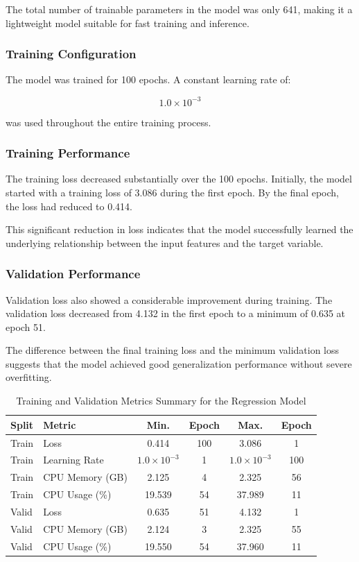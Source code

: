 \documentclass{ieeeaccess}
\begin{document}
The total number of trainable parameters in the model was only 641, making it a lightweight model suitable for fast training and inference.

\subsubsection{Training Configuration}

The model was trained for 100 epochs. A constant learning rate of:

\[
1.0 \times 10^{-3}
\]

was used throughout the entire training process.

\subsubsection{Training Performance}

The training loss decreased substantially over the 100 epochs. Initially, the model started with a training loss of 3.086 during the first epoch. By the final epoch, the loss had reduced to 0.414.

This significant reduction in loss indicates that the model successfully learned the underlying relationship between the input features and the target variable.

\subsubsection{Validation Performance}

Validation loss also showed a considerable improvement during training. The validation loss decreased from 4.132 in the first epoch to a minimum of 0.635 at epoch 51.

The difference between the final training loss and the minimum validation loss suggests that the model achieved good generalization performance without severe overfitting.

\begin{table}[t!]
\centering
\caption{Training and Validation Metrics Summary for the Regression Model}
\begin{tabular}{|l|l|c|c|c|c|}
\hline
\textbf{Split} & \textbf{Metric} & \textbf{Min.} & \textbf{Epoch} & \textbf{Max.} & \textbf{Epoch} \\
\hline
Train & Loss & 0.414 & 100 & 3.086 & 1 \\
Train & Learning Rate & $1.0 \times 10^{-3}$ & 1 & $1.0 \times 10^{-3}$ & 100 \\
Train & CPU Memory (GB) & 2.125 & 4 & 2.325 & 56 \\
Train & CPU Usage (\%) & 19.539 & 54 & 37.989 & 11 \\
\hline
Valid & Loss & 0.635 & 51 & 4.132 & 1 \\
Valid & CPU Memory (GB) & 2.124 & 3 & 2.325 & 55 \\
Valid & CPU Usage (\%) & 19.550 & 54 & 37.960 & 11 \\
\hline
\end{tabular}
\label{tab:regression_metrics_summary}
\end{table}
\end{document}
